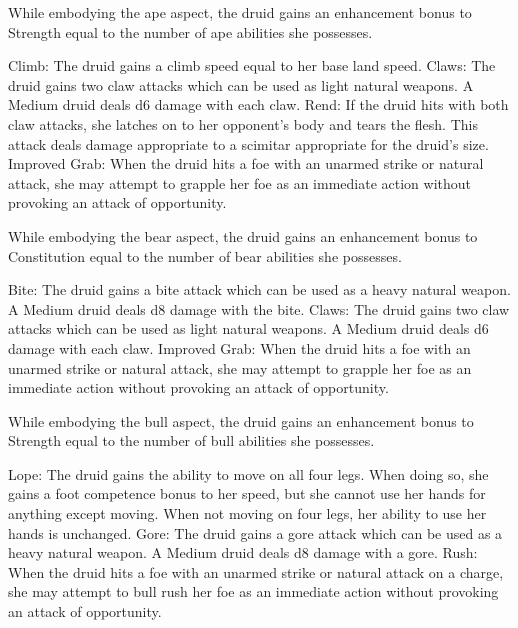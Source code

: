 While embodying the ape aspect, the druid gains an enhancement bonus to Strength equal to the number of ape abilities she possesses.
\begin{wildaspect}
\wilditem Climb: The druid gains a climb speed equal to her base land speed.
\wilditem Claws: The druid gains two claw attacks which can be used as light natural weapons. A Medium druid deals d6 damage with each claw.
\wilditem Rend: If the druid hits with both claw attacks, she latches on to her opponent's body and tears the flesh. This attack deals damage appropriate to a scimitar appropriate for the druid's size.
\wilditem Improved Grab: When the druid hits a foe with an unarmed strike or natural attack, she may attempt to grapple her foe as an immediate action without provoking an attack of opportunity.
\end{wildaspect}

While embodying the bear aspect, the druid gains an enhancement bonus to Constitution equal to the number of bear abilities she possesses.
\begin{wildaspect}
\wilditem Bite: The druid gains a bite attack which can be used as a heavy natural weapon. A Medium druid deals d8 damage with the bite.
\wilditem Claws: The druid gains two claw attacks which can be used as light natural weapons. A Medium druid deals d6 damage with each claw.
\wilditem
\wilditem Improved Grab: When the druid hits a foe with an unarmed strike or natural attack, she may attempt to grapple her foe as an immediate action without provoking an attack of opportunity.
\end{wildaspect}

While embodying the bull aspect, the druid gains an enhancement bonus to Strength equal to the number of bull abilities she possesses.
\begin{wildaspect}
\wilditem Lope: The druid gains the ability to move on all four legs. When doing so, she gains a  foot competence bonus to her speed, but she cannot use her hands for anything except moving. When not moving on four legs, her ability to use her hands is unchanged.
\wilditem Gore: The druid gains a gore attack which can be used as a heavy natural weapon. A Medium druid deals d8 damage with a gore.
\wilditem Rush: When the druid hits a foe with an unarmed strike or natural attack on a charge, she may attempt to bull rush her foe as an immediate action without provoking an attack of opportunity.
\wilditem
\end{wildaspect}

